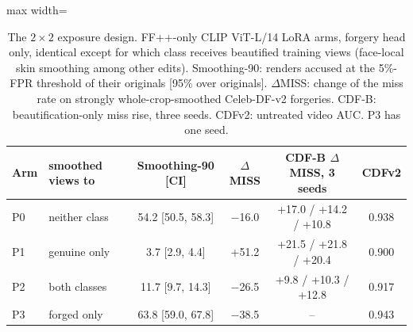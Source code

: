 \documentclass[journal]{IEEEtran}  %
\begin{document}
\begin{table}[t]
\centering
\caption{The $2\times2$ exposure design. FF++-only CLIP ViT-L/14 LoRA arms, forgery head only, identical except for which
class receives beautified training views (face-local skin smoothing among other edits). Smoothing-90: renders accused at the
5\%-FPR threshold of their originals [95\% over originals]. $\Delta$MISS: change of the miss rate on strongly
whole-crop-smoothed Celeb-DF-v2 forgeries. CDF-B: beautification-only miss rise, three seeds. CDFv2: untreated video AUC. P3
has one seed.}
\label{tab:exposure}
\scriptsize
\setlength{\tabcolsep}{3pt}
\begin{adjustbox}{max width=\columnwidth}
\begin{tabular}{@{}l l c c c c@{}}
\toprule
Arm & smoothed views to & Smoothing-90 [CI] & $\Delta$MISS & CDF-B $\Delta$MISS, 3 seeds & CDFv2 \\
\midrule
P0 & neither class & 54.2 [50.5, 58.3] & $-$16.0 & +17.0 / +14.2 / +10.8 & 0.938 \\
P1 & genuine only & 3.7 [2.9, 4.4] & +51.2 & +21.5 / +21.8 / +20.4 & 0.900 \\
P2 & both classes & 11.7 [9.7, 14.3] & $-$26.5 & +9.8 / +10.3 / +12.8 & 0.917 \\
P3 & forged only & 63.8 [59.0, 67.8] & $-$38.5 & -- & 0.943 \\
\bottomrule
\end{tabular}
\end{adjustbox}
\end{table}
\end{document}
